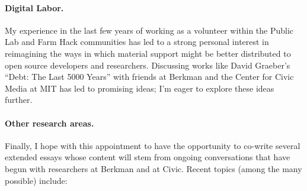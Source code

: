 \documentclass[10pt]{article}
\begin{document}

\paragraph{Digital Labor.} My experience in the last few years of working as a volunteer within the Public Lab and Farm Hack communities has led to a strong personal interest in reimagining the ways in which material support might be better distributed to open source developers and researchers. Discussing works like David Graeber's ``Debt: The Last 5000 Years'' with friends at Berkman and the Center for Civic Media at MIT has led to promising ideas; I'm eager to explore these ideas further. 

\paragraph{Other research areas.} Finally, I hope with this appointment to have the opportunity to co-write several extended essays whose content will stem from ongoing conversations that have begun with researchers at Berkman and at Civic.  Recent topics (among the many possible) include: 
\end{document}
